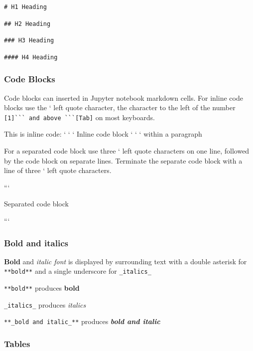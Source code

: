 \documentclass{book}
\begin{document}
\begin{lstlisting}
# H1 Heading
\end{lstlisting}

\begin{lstlisting}
## H2 Heading
\end{lstlisting}

\begin{lstlisting}
### H3 Heading
\end{lstlisting}

\begin{lstlisting}
#### H4 Heading
\end{lstlisting}

\subsubsection{Code Blocks}\label{code-blocks}

Code blocks can inserted in Jupyter notebook markdown cells. For inline
code blocks use the ` left quote character, the character to the left of
the number \lstinline![1]``` and above ```[Tab]! on most keyboards.

This is inline code: ` ` ` Inline code block ` ` ` within a paragraph

For a separated code block use three ` left quote characters on one
line, followed by the code block on separate lines. Terminate the
separate code block with a line of three ` left quote characters.

```

Separated code block

```

\subsubsection{Bold and italics}\label{bold-and-italics}

\textbf{Bold} and \emph{italic font} is displayed by surrounding text
with a double asterisk for \lstinline!**bold**! and a single underscore
for \lstinline!_italics_!

\lstinline!**bold**! produces \textbf{bold}

\lstinline!_italics_! produces \emph{italics}

\lstinline!**_bold and italic_**! produces \textbf{\emph{bold and
italic}}

\subsubsection{Tables}\label{tables}
\end{document}

